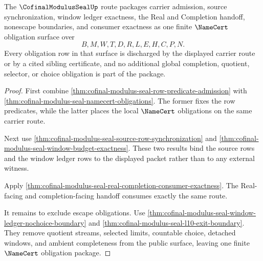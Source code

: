 \begin{theorem}
\label{thm:cofinal-modulus-seal-obligation-surface-packaging}
The $\CofinalModulusSealUp$ route packages carrier admission, source synchronization, window ledger exactness, the Real and Completion handoff, nonescape boundaries, and consumer exactness as one finite $\NameCert$ obligation surface over
$$
B,M,W,T,D,R,L,E,H,C,P,N.
$$
Every obligation row in that surface is discharged by the displayed carrier route or by a cited sibling certificate, and no additional global completion, quotient, selector, or choice obligation is part of the package.
\end{theorem}
\begin{proof}
First combine \autoref{thm:cofinal-modulus-seal-row-predicate-admission} with \autoref{thm:cofinal-modulus-seal-namecert-obligations}. The former fixes the row predicates, while the latter places the local $\NameCert$ obligations on the same carrier route.

Next use \autoref{thm:cofinal-modulus-seal-source-row-synchronization} and \autoref{thm:cofinal-modulus-seal-window-budget-exactness}. These two results bind the source rows and the window ledger rows to the displayed packet rather than to any external witness.

Apply \autoref{thm:cofinal-modulus-seal-real-completion-consumer-exactness}. The Real-facing and completion-facing handoff consumes exactly the same route.

It remains to exclude escape obligations. Use \autoref{thm:cofinal-modulus-seal-window-ledger-nochoice-boundary} and \autoref{thm:cofinal-modulus-seal-l10-exit-boundary}. They remove quotient streams, selected limits, countable choice, detached windows, and ambient completeness from the public surface, leaving one finite $\NameCert$ obligation package.
\end{proof}

